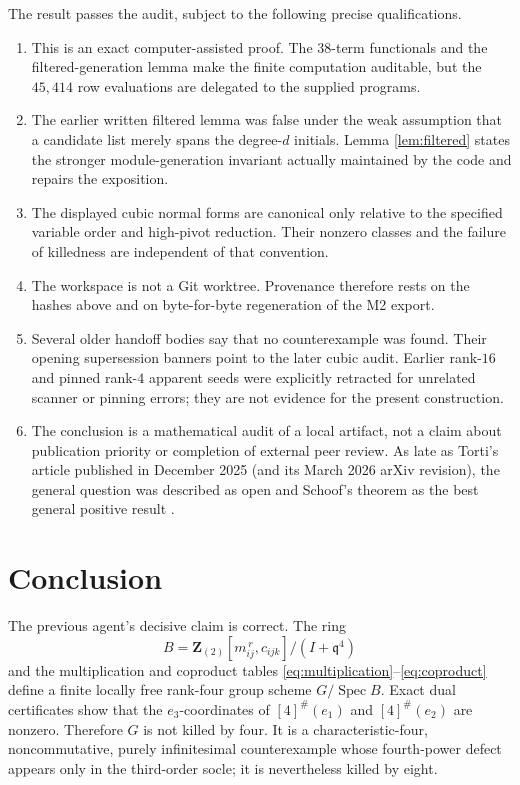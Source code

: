\documentclass[11pt]{article}
\theoremstyle{remark}
\newcommand{\Z}{\mathbf Z}
\newcommand{\Spec}{\operatorname{Spec}}
\newcommand{\q}{\mathfrak q}
\begin{document}
The result passes the audit, subject to the following precise qualifications.
\begin{enumerate}
\item This is an exact computer-assisted proof.  The \(38\)-term
functionals and the filtered-generation lemma make the finite computation
auditable, but the \(45{,}414\) row evaluations are delegated to the supplied
programs.

\item The earlier written filtered lemma was false under the weak assumption
that a candidate list merely spans the degree-\(d\) initials.  Lemma
\ref{lem:filtered} states the stronger module-generation invariant actually
maintained by the code and repairs the exposition.

\item The displayed cubic normal forms are canonical only relative to the
specified variable order and high-pivot reduction.  Their nonzero classes
and the failure of killedness are independent of that convention.

\item The workspace is not a Git worktree.  Provenance therefore rests on
the hashes above and on byte-for-byte regeneration of the M2 export.

\item Several older handoff bodies say that no counterexample was found.
Their opening supersession banners point to the later cubic audit.  Earlier
rank-\(16\) and pinned rank-\(4\) apparent seeds were explicitly retracted for
unrelated scanner or pinning errors; they are not evidence for the present
construction.

\item The conclusion is a mathematical audit of a local artifact, not a
claim about publication priority or completion of external peer review.
As late as Torti's article published in December 2025 (and its March 2026
arXiv revision), the general question was described as open and Schoof's
theorem as the best general positive result
\cite{Schoof2001,Torti}.
\end{enumerate}

\section{Conclusion}

The previous agent's decisive claim is correct.  The ring
\[
 B=\Z_{(2)}[m_{ij}^{\,r},c_{ijk}]/(I+\q^4)
\]
and the multiplication and coproduct tables
\eqref{eq:multiplication}--\eqref{eq:coproduct} define a finite locally free
rank-four group scheme \(G/\Spec B\).  Exact dual certificates show that the
\(e_3\)-coordinates of \([4]^\#(e_1)\) and \([4]^\#(e_2)\) are nonzero.
Therefore \(G\) is not killed by four.  It is a characteristic-four,
noncommutative, purely infinitesimal counterexample whose fourth-power defect
appears only in the third-order socle; it is nevertheless killed by eight.
\end{document}
